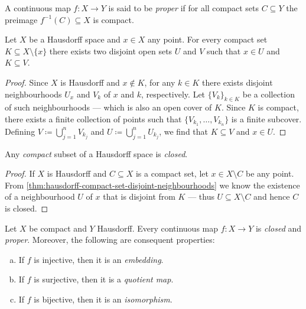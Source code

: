\begin{definition}
\label{def:proper-Top}
A continuous map \(f: X \to Y\) is said to be \emph{proper} if for all compact
sets \(C \subseteq Y\) the preimage \(f^{-1}(C) \subseteq X\) is compact.
\end{definition}

\begin{theorem}
\label{thm:hausdorff-compact-set-disjoint-neighbourhoods}
Let \(X\) be a Hausdorff space and \(x \in X\) any point. For every compact set
\(K \subseteq X \setminus \{x\}\) there exists two disjoint open sets \(U\) and
\(V\) such that \(x \in U\) and \(K \subseteq V\).
\end{theorem}

\begin{proof}
Since \(X\) is Hausdorff and \(x \notin K\), for any \(k \in K\) there exists
disjoint neighbourhoods \(U_x\) and \(V_k\) of \(x\) and \(k\),
respectively. Let \(\{V_{k}\}_{k \in K}\) be a collection of such neighbourhoods
--- which is also an open cover of \(K\). Since \(K\) is compact, there exists a
finite collection of points such that \(\{V_{k_1}, \dots, V_{k_n}\}\) is a
finite subcover. Defining \(V \coloneq \bigcup_{j=1}^n V_{k_j}\) and
\(U \coloneq \bigcup_{j=1}^n U_{k_j}\), we find that \(K \subseteq V\) and
\(x \in U\).
\end{proof}

\begin{corollary}
\label{cor:hausdorff-closed-subset-is-compact}
Any \emph{compact} subset of a Hausdorff space is \emph{closed}.
\end{corollary}

\begin{proof}
If \(X\) is Hausdorff and \(C \subseteq X\) is a compact set, let
\(x \in X \setminus C\) be any point. From
\cref{thm:hausdorff-compact-set-disjoint-neighbourhoods} we know the existence
of a neighbourhood \(U\) of \(x\) that is disjoint from \(K\) --- thus
\(U \subseteq X \setminus C\) and hence \(C\) is closed.
\end{proof}

\begin{corollary}
\label{cor:map-compact-to-hausdorff-is-closed}
Let \(X\) be compact and \(Y\) Hausdorff. Every continuous map \(f: X \to Y\) is
\emph{closed} and \emph{proper}. Moreover, the following are consequent
properties:
\begin{enumerate}[(a)]\setlength\itemsep{0em}
\item If \(f\) is injective, then it is an \emph{embedding}.
\item If \(f\) is surjective, then it is a \emph{quotient map}.
\item If \(f\) is bijective, then it is an \emph{isomorphism}.
\end{enumerate}
\end{corollary}

